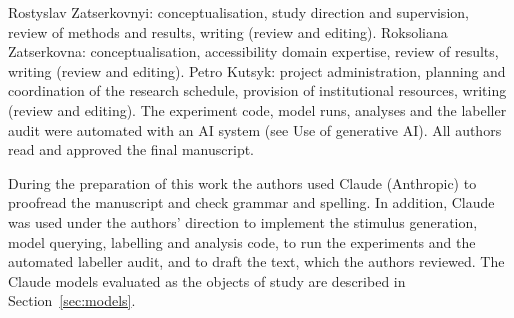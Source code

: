 Rostyslav Zatserkovnyi: conceptualisation, study direction and supervision, review of methods and results, writing (review and editing). Roksoliana Zatserkovna: conceptualisation, accessibility domain expertise, review of results, writing (review and editing). Petro Kutsyk: project administration, planning and coordination of the research schedule, provision of institutional resources, writing (review and editing). The experiment code, model runs, analyses and the labeller audit were automated with an AI system (see Use of generative AI). All authors read and approved the final manuscript.

During the preparation of this work the authors used Claude (Anthropic) to proofread the manuscript and check grammar and spelling. In addition, Claude was used under the authors' direction to implement the stimulus generation, model querying, labelling and analysis code, to run the experiments and the automated labeller audit, and to draft the text, which the authors reviewed. The Claude models evaluated as the objects of study are described in Section~\ref{sec:models}.


